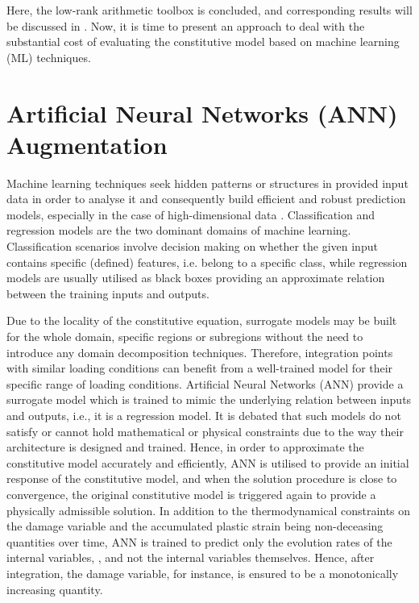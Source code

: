 Here, the low-rank arithmetic toolbox is concluded, and corresponding results will be discussed in . Now, it is time to present an approach to deal with the substantial cost of evaluating the constitutive model based on machine learning (ML) techniques.

\section{Artificial Neural Networks (ANN) Augmentation}

Machine learning techniques seek hidden patterns or structures in provided input data in order to analyse it and consequently build efficient and robust prediction models, especially in the case of high-dimensional data \parencite{theodoridis}. Classification and regression models are the two dominant domains of machine learning. Classification scenarios involve decision making on whether the given input contains specific (defined) features, i.e. belong to a specific class, while regression models are usually utilised as black boxes providing an approximate relation between the training inputs and outputs.

Due to the locality of the constitutive equation, surrogate models may be built for the whole domain, specific regions or subregions without the need to introduce any domain decomposition techniques. Therefore, integration points with similar loading conditions can benefit from a well-trained model for their specific range of loading conditions. Artificial Neural Networks (ANN) provide a surrogate model which is trained to mimic the underlying relation between inputs and outputs, i.e., it is a regression model. It is debated that such models do not satisfy or cannot hold mathematical or physical constraints due to the way their architecture is designed and trained. Hence, in order to approximate the constitutive model accurately and efficiently, ANN is utilised to provide an initial response of the constitutive model, and when the solution procedure is close to convergence, the original constitutive model is triggered again to provide a physically admissible solution. In addition to the thermodynamical constraints on the damage variable and the accumulated plastic strain being non-deceasing quantities over time, ANN is trained to predict only the evolution rates of the internal variables, , and not the internal variables themselves. Hence, after integration, the damage variable, for instance, is ensured to be a monotonically increasing quantity.

